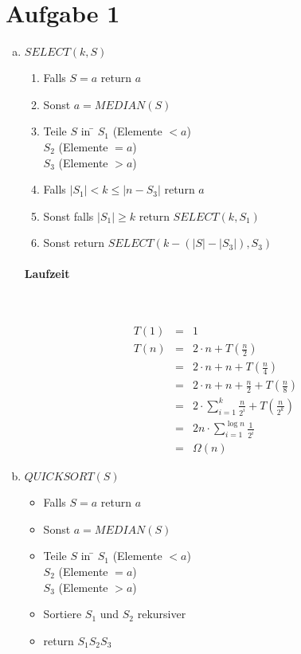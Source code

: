 




\newcommand{\nr}{3}


\section*{Aufgabe 1}
\begin{enumerate}[(a)]
\item $SELECT(k,S)$
    \begin{enumerate}[1.]
    \item Falls $S={a}$ return $a$
    \item Sonst $a = MEDIAN(S)$
    \item 
    \begin{tabbing}
    Teile $S$ in
    \= $S_1$ (Elemente $<a$) \\
    \> $S_2$ (Elemente $=a$) \\
    \> $S_3$ (Elemente $>a$)
    \end{tabbing}
    \item Falls $|S_1| < k \leq |n - S_3|$ return $a$
    \item Sonst falls $|S_1| \geq k$ return $SELECT(k,S_1)$
    \item Sonst return $SELECT(k-(|S|-|S_3|), S_3)$
    \end{enumerate}

    \paragraph{Laufzeit} \ 

    \begin{eqnarray}
    T(1) &=& 1\\
    T(n) &=& 2\cdot n + T(\frac{n}{2})\\
         &=& 2\cdot n + n + T(\frac{n}{4})\\
         &=& 2\cdot n + n + \frac{n}{2} + T(\frac{n}{8})\\
         &=& 2\cdot \sum_{i=1}^{k} \frac{n}{2^i} + T(\frac{n}{2^k})\\
         &=& 2n\cdot \sum_{i=1}^{\log n} \frac{1}{2^i}\\
         &=& \Omega(n)
    \end{eqnarray}

\item $QUICKSORT(S)$
    \begin{itemize}
    \item Falls $S={a}$ return $a$
    \item Sonst $a=MEDIAN(S)$
    \item
    \begin{tabbing}
    Teile $S$ in
    \= $S_1$ (Elemente $<a$) \\
    \> $S_2$ (Elemente $=a$) \\
    \> $S_3$ (Elemente $>a$)
    \end{tabbing}
    \item Sortiere $S_1$ und $S_2$ rekursiver
    \item return $S_1 S_2 S_3$
    \end{itemize}


\end{enumerate}

